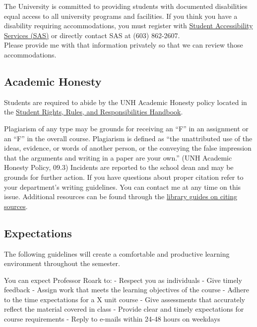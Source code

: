\documentclass[
  letterpaper,
  DIV=11,
  numbers=noendperiod]{scrreprt}
\begin{document}
The University is committed to providing students with documented
disabilities equal access to all university programs and facilities. If
you think you have a disability requiring accommodations, you must
register with \href{http://www.unh.edu/studentaccessibility}{Student
Accessibility Services (SAS)} or directly contact SAS at (603)
862-2607.\\
Please provide me with that information privately so that we can review
those accommodations.

\hypertarget{academic-honesty}{%
\subsection*{Academic Honesty}\label{academic-honesty}}

Students are required to abide by the UNH Academic Honesty policy
located in the \href{https://catalog.unh.edu/srrr/}{Student Rights,
Rules, and Responsibilities Handbook}.

Plagiarism of any type may be grounds for receiving an ``F'' in an
assignment or an ``F'' in the overall course. Plagiarism is defined as
``the unattributed use of the ideas, evidence, or words of another
person, or the conveying the false impression that the arguments and
writing in a paper are your own.'' (UNH Academic Honesty Policy, 09.3)
Incidents are reported to the school dean and may be grounds for further
action. If you have questions about proper citation refer to your
department's writing guidelines. You can contact me at any time on this
issue. Additional resources can be found through the
\href{http://libraryguides.unh.edu/unhmcitingsources}{library guides on
citing sources}.

\hypertarget{expectations}{%
\subsection*{Expectations}\label{expectations}}

The following guidelines will create a comfortable and productive
learning environment throughout the semester.

You can expect Professor Roark to: - Respect you as individuals - Give
timely feedback - Assign work that meets the learning objectives of the
course - Adhere to the time expectations for a X unit course - Give
assessments that accurately reflect the material covered in class -
Provide clear and timely expectations for course requirements - Reply to
e-mails within 24-48 hours on weekdays
\end{document}
